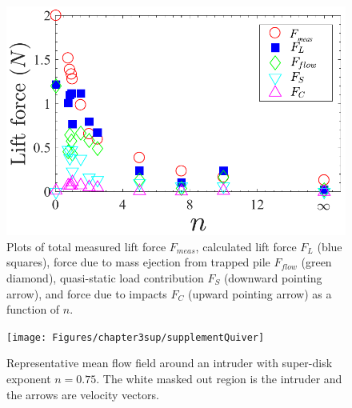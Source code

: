 \begin{figure}[h]
	\includegraphics[width=\textwidth]{Figures/chapter3sup/forcePlotSupplement}
	\caption{Plots of total measured lift force $F_{meas}$, calculated lift force $F_L$ (blue squares), force due to mass ejection from trapped pile $F_{flow}$ (green diamond), quasi-static load contribution $F_S$ (downward pointing arrow), and force due to impacts $F_C$ (upward pointing arrow) as a function of $n$.}
	\label{forcePlotSupplement}
\end{figure}

\begin{figure}
	\texttt{[image: Figures/chapter3sup/supplementQuiver]}
	\caption{Representative mean flow field around an intruder with super-disk exponent $n=0.75$. The white masked out region is the intruder and the arrows are velocity vectors.}
	\label{flowField}
\end{figure}